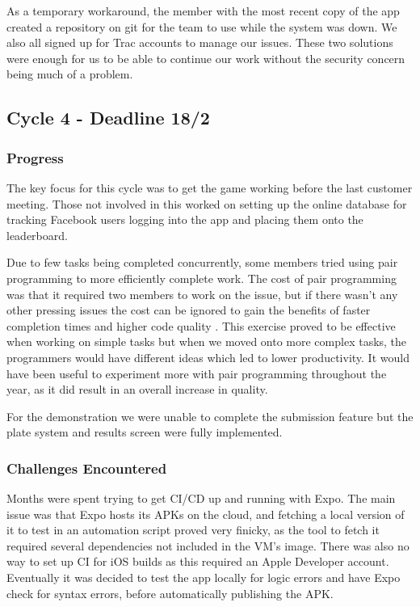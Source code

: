 \documentclass{l3proj}
\begin{document}
As a temporary workaround, the member with the most recent copy of the app created a repository on git for the team to use while the system was down. We also all signed up for Trac accounts to manage our issues. These two solutions were enough for us to be able to continue our work without the security concern being much of a problem.


\subsection{Cycle 4 - Deadline 18/2}
\subsubsection{Progress}
The key focus for this cycle was to get the game working before the last customer meeting. Those not involved in this worked on setting up the online database for tracking Facebook users logging into the app and placing them onto the leaderboard. 

Due to few tasks being completed concurrently, some members tried using pair programming to more efficiently complete work. The cost of pair programming was that it required two members to work on the issue, but if there wasn't any other pressing issues the cost can be ignored to gain the benefits of faster completion times and higher code quality \cite{pairprogramming}. This exercise proved to be effective when working on simple tasks but when we moved onto more complex tasks, the programmers would have different ideas which led to lower productivity. It would have been useful to experiment more with pair programming throughout the year, as it did result in an overall increase in quality.

For the demonstration we were unable to complete the submission feature but the plate system and results screen were fully implemented. 

\subsubsection{Challenges Encountered}
Months were spent trying to get CI/CD up and running with Expo. The main issue was that Expo hosts its APKs on the cloud, and fetching a local version of it to test in an automation script proved very finicky, as the tool to fetch it required several dependencies not included in the VM's image. There was also no way to set up CI for iOS builds as this required an Apple Developer account. Eventually it was decided to test the app locally for logic errors and have Expo check for syntax errors, before automatically publishing the APK.
\end{document}
